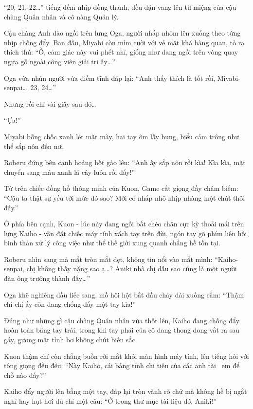 \documentclass[../main.tex]{subfiles}
\begin{document}

``20, 21, 22\dots'' tiếng đếm nhịp đồng thanh, đều đặn vang lên từ miệng của cậu chàng Quân nhân và cô nàng Quản lý.

Cậu chàng Anh đào ngồi trên lưng Oga, người nhấp nhổm lên xuống theo từng nhịp chống đẩy. Ban đầu, Miyabi còn mỉm cười với vẻ mặt khá bàng quan, tỏ ra thích thú: ``Ồ, cảm giác này vui phết nhỉ, giống như đang ngồi trên vòng quay ngựa gỗ ngoài công viên giải trí ấy\dots''

Oga vừa nhún người vừa điềm tĩnh đáp lại: ``Anh thấy thích là tốt rồi, Miyabi-senpai\dots\ 23, 24\dots''

Nhưng rồi chỉ vài giây sau đó\dots

``Ựa!''

Miyabi bỗng chốc xanh lét mặt mày, hai tay ôm lấy bụng, biểu cảm trông như thể sắp nôn đến nơi.

Roberu đứng bên cạnh hoảng hốt gào lên: ``Anh ấy sắp nôn rồi kìa! Kìa kìa, mặt chuyển sang màu xanh lá cây luôn rồi đấy!''

Từ trên chiếc đồng hồ thông minh của Kuon, Game cất giọng đầy châm biếm: ``Cậu ta thật sự yếu tới mức đó sao? Mới có nhấp nhô nhịp nhàng một chút thôi đấy.''

Ở phía bên cạnh, Kuon - lúc này đang ngồi bắt chéo chân cực kỳ thoải mái trên lưng Kaiho - vẫn đặt chiếc máy tính xách tay trên đùi, ngón tay gõ phím liên hồi, bình thản xử lý công việc như thể thế giới xung quanh chẳng hề tồn tại.

Roberu nhìn sang mà mắt tròn mắt dẹt, không tin nổi vào mắt mình: ``Kaiho-senpai, chị không thấy nặng sao ạ\dots? Aniki nhà chị dẫu sao cũng là một người đàn ông trưởng thành đấy\dots''

Oga khẽ nghiêng đầu liếc sang, mồ hôi hột bắt đầu chảy dài xuống cằm: ``Thậm chí chị ấy còn đang chống đẩy một tay kìa!''

Đúng như những gì cậu chàng Quân nhân vừa thốt lên, Kaiho đang chống đẩy hoàn toàn bằng tay trái, trong khi tay phải của cô đang thong dong vắt ra sau gáy, gương mặt tỉnh bơ không chút biến sắc.

Kuon thậm chí còn chẳng buồn rời mắt khỏi màn hình máy tính, lên tiếng hỏi với tông giọng đều đều: ``Này Kaiho, cái bảng tính chi tiêu của các anh tài \hll\ em để chỗ nào đấy?''

Kaiho đẩy người lên bằng một tay, đáp lại tròn vành rõ chữ mà không hề bị ngắt nghỉ hay hụt hơi dù chỉ một câu: ``Ở trong thư mục tài liệu đó, Aniki!''
\end{document}
